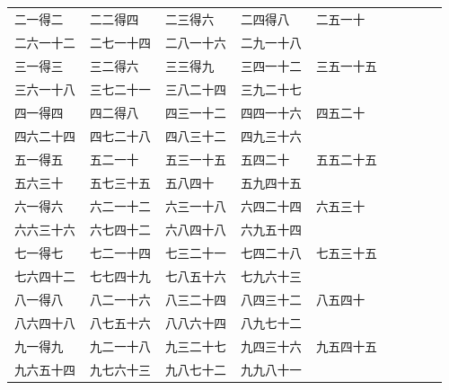 \documentclass[12pt,UTF8]{ctexbook}
\begin{document}
\begin{center}
    \begin{tabular}{ p{5em} p{5em} p{5em} p{5em} p{5em} p{5em} p{5em} p{5em} p{5em}}
        \texttt{二一得二} & \texttt{二二得四} & \texttt{二三得六} & \texttt{二四得八} & \texttt{二五一十}\\
        \texttt{二六一十二} & \texttt{二七一十四} & \texttt{二八一十六} & \texttt{二九一十八} & \\
        \texttt{三一得三} & \texttt{三二得六} & \texttt{三三得九} & \texttt{三四一十二} & \texttt{三五一十五}\\
        \texttt{三六一十八} & \texttt{三七二十一} & \texttt{三八二十四} & \texttt{三九二十七} & \\
        \texttt{四一得四} & \texttt{四二得八} & \texttt{四三一十二} & \texttt{四四一十六} & \texttt{四五二十}\\
        \texttt{四六二十四} & \texttt{四七二十八} & \texttt{四八三十二} & \texttt{四九三十六} & \\
        \texttt{五一得五} & \texttt{五二一十} & \texttt{五三一十五} & \texttt{五四二十} & \texttt{五五二十五}\\
        \texttt{五六三十} & \texttt{五七三十五} & \texttt{五八四十} & \texttt{五九四十五} & \\
        \texttt{六一得六} & \texttt{六二一十二} & \texttt{六三一十八} & \texttt{六四二十四} & \texttt{六五三十}\\
        \texttt{六六三十六} & \texttt{六七四十二} & \texttt{六八四十八} & \texttt{六九五十四} & \\
        \texttt{七一得七} & \texttt{七二一十四} & \texttt{七三二十一} & \texttt{七四二十八} & \texttt{七五三十五}\\
        \texttt{七六四十二} & \texttt{七七四十九} & \texttt{七八五十六} & \texttt{七九六十三} & \\
        \texttt{八一得八} & \texttt{八二一十六} & \texttt{八三二十四} & \texttt{八四三十二} & \texttt{八五四十}\\
        \texttt{八六四十八} & \texttt{八七五十六} & \texttt{八八六十四} & \texttt{八九七十二} & \\
        \texttt{九一得九} & \texttt{九二一十八} & \texttt{九三二十七} & \texttt{九四三十六} & \texttt{九五四十五}\\
        \texttt{九六五十四} & \texttt{九七六十三} & \texttt{九八七十二} & \texttt{九九八十一} & \\
    \end{tabular}
\end{center}
\end{document}
